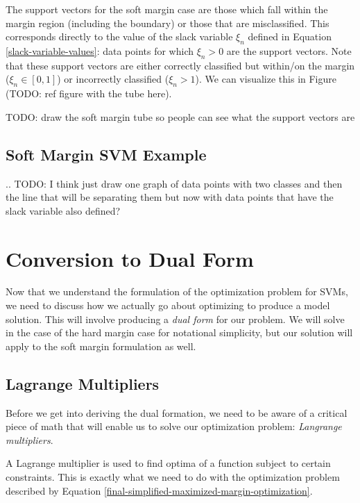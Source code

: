 The support vectors for the soft margin case are those which fall within the margin region (including the boundary) or those that are misclassified. This corresponds directly to the value of the slack variable $\xi_{n}$ defined in Equation \ref{slack-variable-values}: data points for which $\xi_{n} > 0$ are the support vectors. Note that these support vectors are either correctly classified but within/on the margin ($\xi_{n} \in [0,1]$) or incorrectly classified ($\xi_{n} > 1$). We can visualize this in Figure (TODO: ref figure with the tube here).


TODO: draw the soft margin tube so people can see what the support vectors are

\subsection{Soft Margin SVM Example}
.. TODO: I think just draw one graph of data points with two classes and then the line that will be separating them but now with data points that have the slack variable also defined?

\section{Conversion to Dual Form}
Now that we understand the formulation of the optimization problem for SVMs, we need to discuss how we actually go about optimizing to produce a model solution. This will involve producing a \textit{dual form} for our problem. We will solve in the case of the hard margin case for notational simplicity, but our solution will apply to the soft margin formulation as well.


\subsection{Lagrange Multipliers}
Before we get into deriving the dual formation, we need to be aware of a critical piece of math that will enable us to solve our optimization problem: \textit{Langrange multipliers}.

A Lagrange multiplier is used to find optima of a function subject to certain constraints. This is exactly what we need to do with the optimization problem described by Equation \ref{final-simplified-maximized-margin-optimization}.

